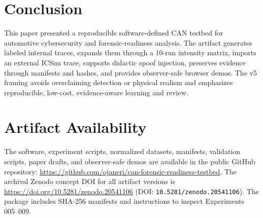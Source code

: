 \documentclass[conference]{IEEEtran}
\begin{document}
\section{Conclusion}
This paper presented a reproducible software-defined CAN testbed for automotive cybersecurity and forensic-readiness analysis. The artifact generates labeled internal traces, expands them through a 10-run intensity matrix, imports an external ICSim trace, supports didactic spoof injection, preserves evidence through manifests and hashes, and provides observer-safe browser demos. The v5 framing avoids overclaiming detection or physical realism and emphasizes reproducible, low-cost, evidence-aware learning and review.

\section*{Artifact Availability}
The software, experiment scripts, normalized datasets, manifests, validation scripts, paper drafts, and observer-safe demos are available in the public GitHub repository: \url{https://github.com/ojaneri/can-forensic-readiness-testbed}. The archival Zenodo concept DOI for all artifact versions is \url{https://doi.org/10.5281/zenodo.20541106} (DOI: \texttt{10.5281/zenodo.20541106}). The package includes SHA-256 manifests and instructions to inspect Experiments 005--009.



\end{document}
